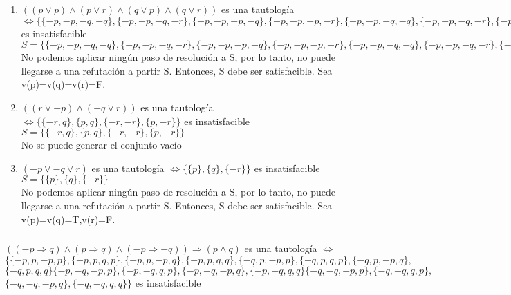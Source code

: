 \documentclass[10pt,a4paper]{article}
\begin{document}
\begin{enumerate}
        $\{-q, -p\}-(-q, -p) \cup \{p, q\}-(p, q)=\{\}$ \\
        $S=\{\{-q, -p\},\{-q, p\},\{-q, q\},\{p, -p\},\{p, p\},\{p, q\},\{q, -p\},\{q, p\},\{q, q\},\{\}\} \Rightarrow $ es insatisfacible
        \item $((p \vee p)\wedge(p \vee r)\wedge(q \vee p)\wedge(q \vee r))$ es una tautología $ \Leftrightarrow \{\{-p, -p, -q, -q\},\{-p, -p, -q, -r\},\{-p, -p, -p, -q\},\{-p, -p, -p, -r\},\{-p, -p, -q, -q\},\{-p, -p, -q, -r\},\{-p, -p, -p, -q\},\{-p, -p, -p, -r\},\{-p, -r, -q, -q\},\{-p, -r, -q, -r\},\{-p, -r, -p, -q\},\{-p, -r, -p, -r\},\{-p, -r, -q, -q\},\{-p, -r, -q, -r\},\{-p, -r, -p, -q\},\{-p, -r, -p, -r\}\} $ es insatisfacible \\
        $S=\{\{-p, -p, -q, -q\},\{-p, -p, -q, -r\},\{-p, -p, -p, -q\},\{-p, -p, -p, -r\},\{-p, -p, -q, -q\},\{-p, -p, -q, -r\},\{-p, -p, -p, -q\},\{-p, -p, -p, -r\},\{-p, -r, -q, -q\},\{-p, -r, -q, -r\},\{-p, -r, -p, -q\},\{-p, -r, -p, -r\},\{-p, -r, -q, -q\},\{-p, -r, -q, -r\},\{-p, -r, -p, -q\},\{-p, -r, -p, -r\}\}$ \\
        No podemos aplicar ningún paso de resolución a S, por lo tanto, no puede llegarse a una refutación a partir S. Entonces, S debe ser satisfacible. Sea v(p)=v(q)=v(r)=F.
        \item $((r \vee -p)\wedge(-q \vee r))$ es una tautología $ \Leftrightarrow \{\{-r, q\},\{p, q\},\{-r, -r\},\{p, -r\}\} $ es insatisfacible \\
        $S=\{\{-r, q\},\{p, q\},\{-r, -r\},\{p, -r\}\}$ \\
        No se puede generar el conjunto vacío
        \item $(-p \vee -q \vee r)$ es una tautología $ \Leftrightarrow \{\{p\},\{q\},\{-r\}\} $ es insatisfacible \\
        $S=\{\{p\},\{q\},\{-r\}\}$ \\
        No podemos aplicar ningún paso de resolución a S, por lo tanto, no puede llegarse a una refutación a partir S. Entonces, S debe ser satisfacible. Sea v(p)=v(q)=T,v(r)=F.
    \end{enumerate}
\subsubsection{}
$((-p \Rightarrow q) \wedge (p \Rightarrow q) \wedge (-p \Rightarrow -q)) \Rightarrow (p \wedge q)$ es una tautología $\Leftrightarrow$ \\
$ \{\{-p, p, -p, p\},\{-p, p, q, p\},\{-p, p, -p, q\},\{-p, p, q, q\},\{-q, p, -p, p\},\{-q, p, q, p\},\{-q, p, -p, q\},$ \\
$\{-q, p, q, q\} \{-p, -q, -p, p\},\{-p, -q, q, p\},\{-p, -q, -p, q\},\{-p, -q, q, q\} \{-q, -q, -p, p\},\{-q, -q, q, p\},$ \\
$\{-q, -q, -p, q\},\{-q, -q, q, q\}\}$ es insatisfacible \\
\end{document}
